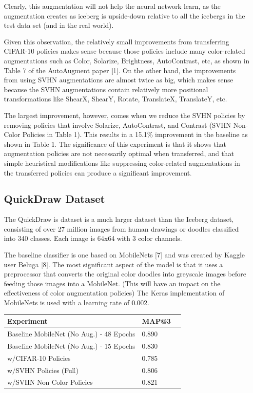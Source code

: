 \documentclass[10pt,twocolumn,letterpaper]{article}
\begin{document}
Clearly, this augmentation will not help the neural network learn, as the augmentation creates as iceberg is upside-down relative to all the icebergs in the test data set (and in the real world).

Given this observation, the relatively small improvements from transferring CIFAR-10 policies makes sense because those policies include many color-related augmentations such as Color, Solarize, Brightness, AutoContrast, etc, as shown in Table 7 of the AutoAugment paper [1].  On the other hand, the improvements from using SVHN augmentations are almost twice as big, which makes sense because the SVHN augmentations contain relatively more positional transformations like ShearX, ShearY, Rotate, TranslateX, TranslateY, etc.

The largest improvement, however, comes when we reduce the SVHN policies by removing policies that involve Solarize, AutoContrast, and Contrast (SVHN Non-Color Policies in Table 1).  This results in a 15.1\% improvement in the baseline as shown in Table 1.  The significance of this experiment is that it shows that augmentation policies are not necessarily optimal when transferred, and that simple heuristical modifications like suppressing color-related augmentations in the transferred policies can produce a significant improvement.


\subsection{QuickDraw Dataset}

The QuickDraw is dataset is a much larger dataset than the Iceberg dataset, consisting of over 27 million images from human drawings or doodles classified into 340 classes.  Each image is 64x64 with 3 color channels.  

The baseline classifier is one based on MobileNets [7] and was created by Kaggle user Beluga [8].  The most significant aspect of the model is that it uses a preprocessor that converts the original color doodles into greyscale images before feeding those images into a MobileNet.  (This will have an impact on the effectiveness of color augmentation policies)  The Keras implementation of MobileNets is used with a learning rate of 0.002.


    \begin{table}[h]
      \begin{tabular}{lll}
        \hline
        Experiment &MAP@3    \\ \hline
        Baseline MobileNet (No Aug.) - 48 Epochs  &0.890 \\
        Baseline MobileNet (No Aug.) - 15 Epochs  &0.830 \\        
        w/CIFAR-10 Policies &0.785  \\
        w/SVHN Policies (Full) &0.806  \\
        w/SVHN Non-Color Policies &0.821  \\  
        \hline
      \end{tabular}
    \end{table}
\end{document}
